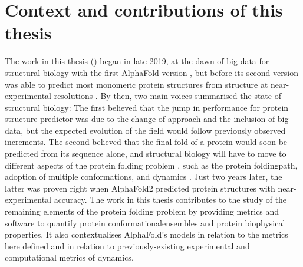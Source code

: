 \chapter{Context and contributions of this thesis}\label{chapter:contributions}
\newpage
\mbox{}
\newpage

The work in this thesis () began in late 2019, at the dawn of big data for structural biology with the first AlphaFold version \cite{senior_improved_2020}, but before its second version was able to predict most monomeric protein structures from structure at near-experimental resolutions \cite{jumper_highly_2021}. By then, two main voices summarised the state of structural biology: The first believed that the jump in performance for protein structure predictor was due to the change of approach and the inclusion of big data, but the expected evolution of the field would follow previously observed increments. The second believed that the final fold of a protein would soon be predicted from its sequence alone, and structural biology will have to move to different aspects of the protein folding problem \cite{alquraishi_alphafold_2018}, such as the protein \gls{foldingpath}, adoption of multiple \glspl{conformation}, and \gls{dynamics} \cite{powers_proteome_2021}. Just two years later, the latter was proven right when AlphaFold2 predicted protein structures with near-experimental accuracy. The work in this thesis contributes to the study of the remaining elements of the protein folding problem by providing metrics and software to quantify protein \glspl{conformationalensemble} and protein biophysical properties. It also contextualises AlphaFold's models in relation to the metrics here defined and in relation to previously-existing experimental and computational metrics of \gls{dynamics}.

